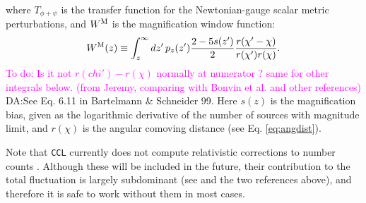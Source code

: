 \documentclass[\docopts]{\docclass}
\newcommand{\todo}[1]{\textcolor{magenta}{To do: #1}}
\newcommand{\damonge}[1]{\textcolor{green!55!blue}{DA:#1}}
\newcommand{\ccl}{{\tt CCL}\xspace}
\begin{document}
\begin{itemize}
\begin{align}
        \end{align}
        where $T_{\phi+\psi}$ is the transfer function for the Newtonian-gauge scalar metric perturbations, and $W^{\rm M}$ is the magnification window function:
        \begin{equation}
          W^{\rm M}(z)\equiv\int_z^\infty dz'\,p_z(z')\frac{2-5s(z')}{2}\frac{r(\chi'-\chi)}{r(\chi')r(\chi)}.
        \end{equation}
        \todo{Is it not $r(chi')-r(\chi)$ normally at numerator ? same for other integrals below. (from Jeremy, comparing with Bonvin et al. and other references)} \damonge{See Eq. 6.11 in Bartelmann \& Schneider 99.}
        Here $s(z)$ is the magnification bias, given as the logarithmic derivative of the number of sources with magnitude limit, and $r(\chi)$ is the angular comoving distance (see Eq. \ref{eq:angdist}).
\end{itemize}
Note that \ccl currently does not compute relativistic corrections to number counts \cite{2011PhRvD..84d3516C,2011PhRvD..84f3505B}. Although these will be included in the future, their contribution to the total fluctuation is largely subdominant (see \cite{GReffects} and the two references above), and therefore it is safe to work without them in most cases.
\end{document}
